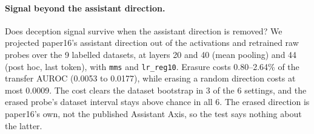 \paragraph{Signal beyond the assistant direction.} Does deception signal survive when the assistant direction is removed? %
We projected paper16's assistant direction out of the activations and retrained raw probes over the 9 labelled datasets, at layers 20 and 40 (mean pooling) and 44 (post hoc, last token), with \texttt{mms} and \texttt{lr\_reg10}. %
Erasure costs 0.80--2.64\% of the transfer AUROC (0.0053 to 0.0177), while erasing a random direction costs at most 0.0009. %
The cost clears the dataset bootstrap in 3 of the 6 settings, and the erased probe's dataset interval stays above chance in all 6. %
The erased direction is paper16's own, not the published Assistant Axis, so the test says nothing about the latter. %

